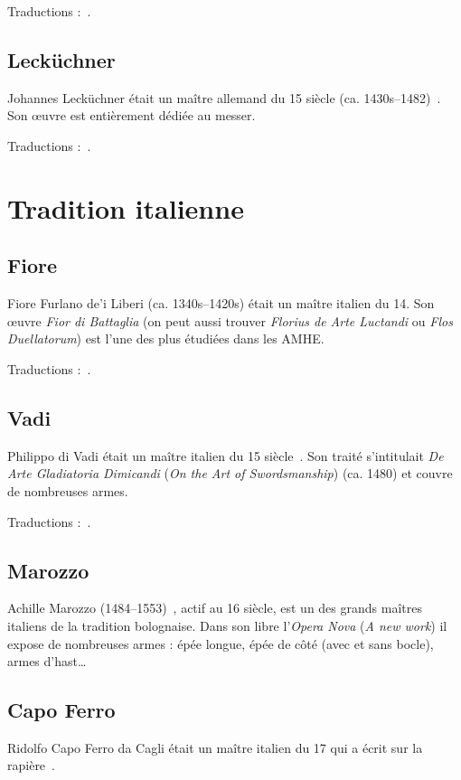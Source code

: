 Traductions :~\cite{gaurin:talhoffer:2005}.


\subsection{Lecküchner}
\label{app:maitres:lekuchner}

Johannes Lecküchner était un maître allemand du 15\ieme{} siècle (ca. 1430s–1482)~\cite{wiktenauer:leckuchner}.
Son œuvre est entièrement dédiée au messer.


Traductions :~\cite{ardamhe:leckuchner}.


\section{Tradition italienne}



\subsection{Fiore}
\label{app:maitres:fiore}

Fiore Furlano de'i Liberi (ca. 1340s–1420s) était un maître italien du 14\ieme{}.
Son œuvre \emph{Fior di Battaglia} (on peut aussi trouver \emph{Florius de Arte Luctandi} ou \emph{Flos Duellatorum}) est l'une des plus étudiées dans les AMHE.

Traductions :~\cite{conan:fiore, exiles:fiore_getty}.


\subsection{Vadi}
\label{app:maitres:vadi}

Philippo di Vadi était un maître italien du 15\ieme{} siècle~\cite{wiktenauer:vadi}.
Son traité s'intitulait \emph{De Arte Gladiatoria Dimicandi} (\emph{On the Art of Swordsmanship}) (ca. 1480) et couvre de nombreuses armes.

Traductions :~\cite{chaize:vadi, patrouix:vadi:2013, petit:vadi}.


\subsection{Marozzo}
\label{app:maitres:marozzo}

Achille Marozzo (1484–1553)~\cite{wiktenauer:marozzo}, actif au 16\ieme{} siècle, est un des grands maîtres italiens de la tradition bolognaise.
Dans son libre l'\emph{Opera Nova} (\emph{A new work}) il expose de nombreuses armes : épée longue, épée de côté (avec et sans bocle), armes d'hast…


\subsection{Capo Ferro}
\label{app:maitres:capo_ferro}

Ridolfo Capo Ferro da Cagli était un maître italien du 17\ieme{} qui a écrit sur la rapière~\cite{wiktenauer:capo_ferro}.
